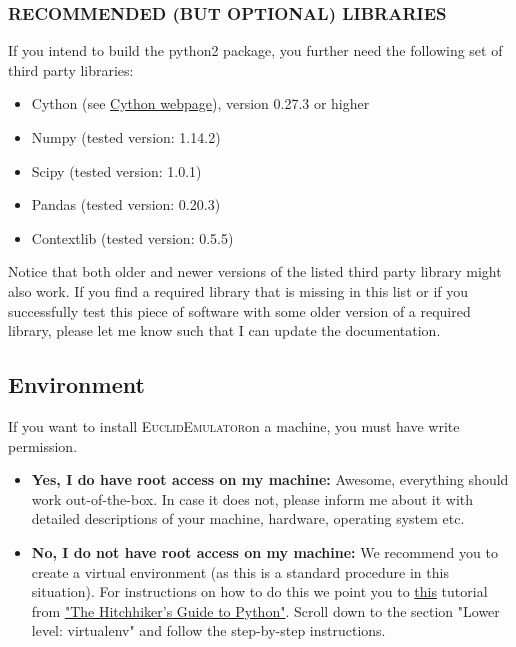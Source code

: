 \documentclass[american,11pt]{article}
\def\code#1{\texttt{#1}}
\begin{document}
\subsubsection{RECOMMENDED (BUT OPTIONAL) LIBRARIES}
If you intend to build the python2 package, you further need the following set of third party libraries:

\begin{itemize}
\item Cython (see \href{https://github.com/cython/cython}{Cython webpage}), version 0.27.3 or higher
\item Numpy (tested version: 1.14.2)
\item Scipy (tested version: 1.0.1)
\item Pandas (tested version: 0.20.3)
\item Contextlib (tested version: 0.5.5)
\end{itemize}

Notice that both older and newer versions of the listed third party library might also work. If you find a required library that is missing in this list or if you successfully test this piece of software with some older version of a required library, please let me know such that I can update the documentation.


\subsection{Environment}
\label{virtualenv}
If you want to install \textsc{EuclidEmulator}on a machine, you must have write permission.

\begin{itemize}
\item{\bfseries Yes, I do have root access on my machine:} Awesome, everything should work out-of-the-box. In case it does not, please inform me about it with detailed descriptions of your machine, hardware, operating system etc.

\item{\bfseries No, I do not have root access on my machine:} We recommend you to create a virtual environment (as this is a standard procedure in this situation). For instructions on how to do this we point you to \href{docs.python-guide.org/dev/virtualenvs}{this} tutorial from \href{https://docs.python-guide.org}{"The Hitchhiker's Guide to Python"}. Scroll down to the section "Lower level: virtualenv" and follow the step-by-step instructions. 
\end{itemize}
\end{document}
